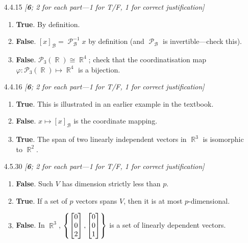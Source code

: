 \documentclass{amsart}
\theoremstyle{definition}
\theoremstyle{definition}
\DeclareMathOperator{\R}{\mathbb{R}}
\DeclareMathOperator{\1}{\mathbbm{1}}
\DeclareMathOperator{\powerset}{\mathcal{P}}
\DeclareMathOperator{\B}{\mathcal{B}}
\renewcommand{\phi}{\varphi}
\newcommand{\polyn}[2]{\mathcal{P}_{#1}(#2)}
\begin{document}
	
	\begin{enumerate}[itemsep = 2mm]
		\item[4.4.15] \textit{[\textbf{6}; 2 for each part---1 for T/F, 1 for correct justification]}
		\begin{enumerate}
			\item \textbf{True}. By definition.
			
			\item \textbf{False}. $[x]_{\B} = \powerset_{\B}^{-1} x$ by definition (and $\powerset_{\B}$ is invertible---check this).
			
			\item \textbf{False}. $\polyn{3}{\R} \cong \R^4$; check that the coordinatisation map $\phi : \polyn{3}{\R} \mapsto \R^4$ is a bijection.
		\end{enumerate}
		
		
		\item[4.4.16] \textit{[\textbf{6}; 2 for each part---1 for T/F, 1 for correct justification]}
		\begin{enumerate}
			\item \textbf{True}. This is illustrated in an earlier example in the textbook.
			
			
			\item \textbf{False}. $x \mapsto [x]_{\B}$ is the coordinate mapping.
			
			\item \textbf{True}. The span of two linearly independent vectors in $\R^3$ is isomorphic to $\R^2$.
		\end{enumerate}
		
		
		
		\item[4.5.30] \textit{[\textbf{6}; 2 for each part---1 for T/F, 1 for correct justification]}
		\begin{enumerate}
			\item \textbf{False}. Such $V$ has dimension strictly less than $p$.

			\item \textbf{True}. If a set of $p$ vectors spans $V$, then it is at most $p$-dimensional.

			\item \textbf{False}. In $\R^3$, $\set{\begin{bmatrix}
				0 \\ 0 \\ 2
				\end{bmatrix}, \begin{bmatrix}
				0 \\ 0 \\ 1
				\end{bmatrix}}$ is a set of linearly dependent vectors.
		\end{enumerate}
		

\end{enumerate}
\end{document}
